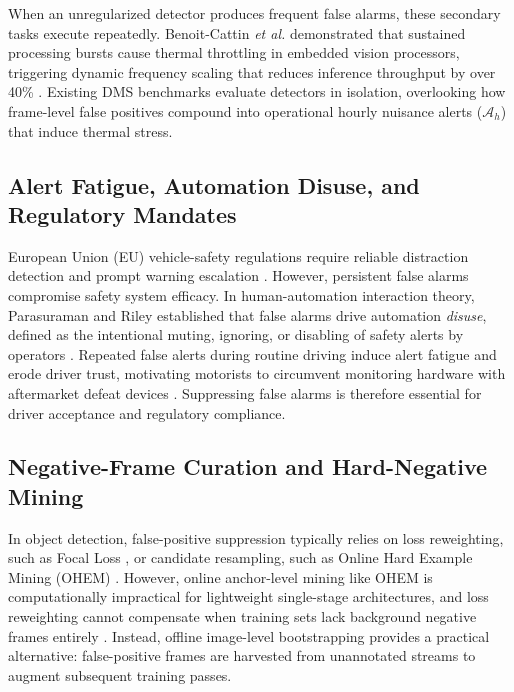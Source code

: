 \documentclass[conference]{IEEEtran}
\begin{document}
When an unregularized detector produces frequent false alarms, these secondary tasks execute repeatedly. Benoit-Cattin \textit{et al.} demonstrated that sustained processing bursts cause thermal throttling in embedded vision processors, triggering dynamic frequency scaling that reduces inference throughput by over 40\% \cite{benoitcattin2020thermal}. Existing DMS benchmarks evaluate detectors in isolation, overlooking how frame-level false positives compound into operational hourly nuisance alerts ($\mathcal{A}_h$) that induce thermal stress.

\subsection{Alert Fatigue, Automation Disuse, and Regulatory Mandates}
European Union (EU) vehicle-safety regulations require reliable distraction detection and prompt warning escalation \cite{ec2026safercars}. However, persistent false alarms compromise safety system efficacy. In human-automation interaction theory, Parasuraman and Riley established that false alarms drive automation \textit{disuse}, defined as the intentional muting, ignoring, or disabling of safety alerts by operators \cite{parasuraman1997humans}. Repeated false alerts during routine driving induce alert fatigue and erode driver trust, motivating motorists to circumvent monitoring hardware with aftermarket defeat devices \cite{lambert2026chinese, parasuraman1997humans}. Suppressing false alarms is therefore essential for driver acceptance and regulatory compliance.

\subsection{Negative-Frame Curation and Hard-Negative Mining}
In object detection, false-positive suppression typically relies on loss reweighting, such as Focal Loss \cite{lin2017focal}, or candidate resampling, such as Online Hard Example Mining (OHEM) \cite{shrivastava2016ohem}. However, online anchor-level mining like OHEM is computationally impractical for lightweight single-stage architectures, and loss reweighting cannot compensate when training sets lack background negative frames entirely \cite{lin2017focal}. Instead, offline image-level bootstrapping provides a practical alternative: false-positive frames are harvested from unannotated streams to augment subsequent training passes.
\end{document}
